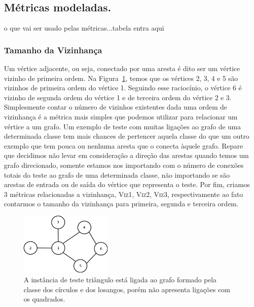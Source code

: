 \subsection{Métricas modeladas.}
\label{subsec::pg_metricas_grafos}

o que vai ser usado pelas métricas...tabela entra aqui


\subsubsection{Tamanho da Vizinhança}
\label{subsubsection::neighborhoodsize}

Um vértice adjacente, ou seja, conectado por uma aresta é dito ser um vértice vizinho de primeira ordem. Na Figura~\ref{fig::vizinhos}, temos que os vértices 2, 3, 4 e 5 são vizinhos de primeira ordem do vértice 1. Seguindo esse raciocínio, o vértice 6 é vizinho de segunda ordem do vértice 1 e de terceira ordem do vértice 2 e 3. Simplesmente contar o número de vizinhos existentes dada uma ordem de vizinhança é a métrica mais simples que podemos utilizar para relacionar um vértice a um grafo. Um exemplo de teste com muitas ligações ao grafo de uma determinada classe tem mais chances de pertencer aquela classe do que um outro exemplo que tem pouca ou nenhuma aresta que o conecta àquele grafo. Repare que decidimos não levar em consideração a direção das arestas quando temos um grafo direcionado, somente estamos nos importando com o número de conexões totais do teste ao grafo de uma determinada classe, não importando se são arestas de entrada ou de saída do vértice que representa o teste. Por fim, criamos 3 métricas relacionadas a vizinhança, \textsc{Viz1}, \textsc{Viz2}, \textsc{Viz3}, respectivamente ao fato contarmos o tamanho da vizinhança para primeira, segunda e terceira ordem.

\begin{figure}[ht!]
\centering
\includegraphics[width=0.4\textwidth]{figures/vizinhos.png}
\caption{A instância de teste triângulo está ligada ao grafo formado pela classe dos círculos e dos losangos, porém não apresenta ligações com os quadrados.}
\label{fig::vizinhos}
\end{figure}

